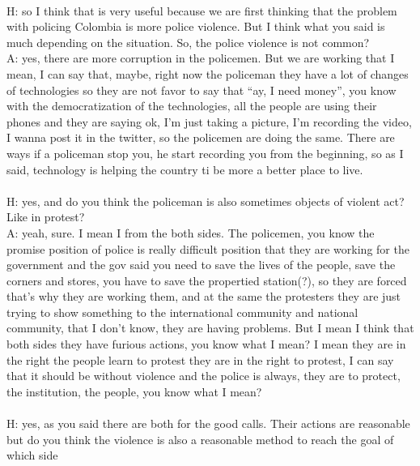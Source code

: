 \documentclass{phyasgn}\usepackage{nag}
\begin{document}
\\
H: so I think that is very useful because we are first thinking that the problem with policing Colombia is more police violence. But I think what you said is much depending on the situation. So, the police violence is not common?\\
A: yes, there are more corruption in the policemen. But we are working that I mean, I can say that, maybe, right now the policeman they have a lot of changes of technologies so they are not favor to say that “ay, I need money”, you know with the democratization of the technologies, all the people are using their phones and they are saying ok, I’m just taking a picture, I’m recording the video, I wanna post it in the twitter, so the policemen are doing the same. There are ways if a policeman stop you, he start recording you from the beginning, so as I said, technology is helping the country ti be more a better place to live.\\
\\
H: yes, and do you think the policeman is also sometimes objects of violent act? Like in protest?\\
A: yeah, sure. I mean I from the both sides. The policemen, you know the promise position of police is really difficult position that they are working for the government and the gov said you need to save the lives of the people, save the corners and stores, you have to save the propertied station(?), so they are forced that’s why they are working them, and at the same  the protesters they are just trying to show something to the international community and national community, that I don’t know, they are having problems. But I mean I think that both sides they have furious actions, you know what I mean? I mean they are in the right the people learn to protest they are in the right to protest, I can say that it should be without violence and the police is always, they are to protect, the institution, the people, you know what I mean?\\
\\
H: yes, as you said there are both for the good calls. Their actions are reasonable but do you think the violence is also a reasonable method to reach the goal of which side\\
\end{document}
